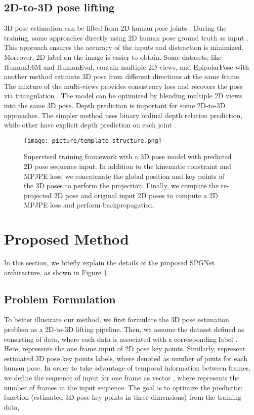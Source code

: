 \documentclass[runningheads]{llncs}
\begin{document}
\subsection{2D-to-3D pose lifting} 3D pose estimation can be lifted from 2D human pose joints \cite{MartinezHRL17,Chen_2016_CVPR,Pavlakos_2018}. During the training, some approaches directly using 2D human pose ground truth as input \cite{Kocabas_2019_CVPR,Drover_2018_ECCVW}. This approach ensures the accuracy of the inputs and distraction is minimized. Moreover, 2D label on the image is easier to obtain. Some datasets, like Human3.6M and HumanEval, contain multiple 2D views, and EpipolarPose with another method estimate 3D pose from different directions at the same frame. The mixture of the multi-views provides consistency loss and recovers the pose via triangulation \cite{Kocabas_2019_CVPR}. The model can be optimized by blending multiple 2D views into the same 3D pose. Depth prediction is important for some 2D-to-3D approaches. The simpler method uses binary ordinal depth relation prediction, while other have explicit depth prediction on each joint \cite{Chen_2016_CVPR,Nie_2017_Monocular3H,Pavlakos_2018}.



\begin{figure}[!htp]
\texttt{[image: picture/template\_structure.png]}
\caption{Supervised training framework with a 3D pose model with predicted 2D pose sequence input. In addition to the kinematic constraint and MPJPE loss, we concatenate the global position and key points of the 3D poses to perform the projection. Finally, we compare the re-projected 2D pose and original input 2D poses to compute a 2D MPJPE loss and perform backpropagation.} \label{model}
\end{figure}

\section{Proposed Method}

In this section, we briefly explain the details of the proposed SPGNet architecture, as shown in Figure \ref{model}.



\subsection{Problem Formulation}
To better illustrate our method, we first formulate the 3D pose estimation problem as a 2D-to-3D lifting pipeline. Then, we assume the dataset defined as  consisting of  data, where each data  is associated with a corresponding label . Here,  represents the one frame input of 2D pose key points. Similarly,  represent estimated 3D pose key points labels, where  denoted as number of joints for each human pose. In order to take advantage of temporal information between frames, we define the sequence of input for one frame as vector , where  represents the number of frames in the input sequence. The goal is to optimize the prediction function (estimated 3D pose key points in three dimensions)  from the training data,
\end{document}
